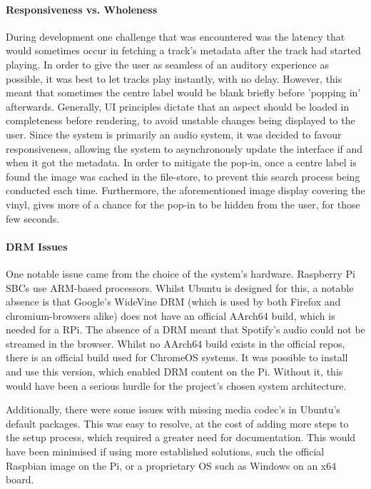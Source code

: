                 \paragraph{Responsiveness vs. Wholeness} During development one challenge that was encountered was the latency that would sometimes occur in fetching a track's metadata after the track had started playing. In order to give the user as seamless of an auditory experience as possible, it was best to let tracks play instantly, with no delay. However, this meant that sometimes the centre label would be blank briefly before 'popping in' afterwards. Generally, UI principles dictate that an aspect should be loaded in completeness before rendering, to avoid unstable changes being displayed to the user. Since the system is primarily an audio system, it was decided to favour responsiveness, allowing the system to asynchronously update the interface if and when it got the metadata. In order to mitigate the pop-in, once a centre label is found the image was cached in the file-store, to prevent this search process being conducted each time. Furthermore, the aforementioned image display covering the vinyl, gives more of a chance for the pop-in to be hidden from the user, for those few seconds.
    
                \paragraph{DRM Issues} One notable issue came from the choice of the system's hardware. Raspberry Pi SBCs use ARM-based processors. Whilst Ubuntu is designed for this, a notable absence is that Google's WideVine DRM (which is used by both Firefox and chromium-browsers alike) does not have an official AArch64 build, which is needed for a RPi. The absence of a DRM meant that Spotify's audio could not be streamed in the browser. Whilst no AArch64 build exists in the official repos, there is an official build used for ChromeOS systems. It was possible to install and use this version, which enabled DRM content on the Pi. Without it, this would have been a serious hurdle for the project's chosen system architecture.
    
                Additionally, there were some issues with missing media codec's in Ubuntu's default packages. This was easy to resolve, at the cost of adding more steps to the setup process, which required a greater need for documentation. This would have been minimised if using more established solutions, such the official Raspbian image on the Pi, or a proprietary OS such as Windows on an x64 board.
    
